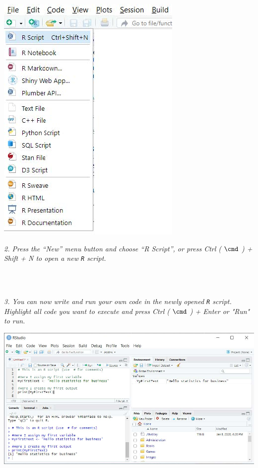 \begin{minipage}{0.5\textwidth}
\includegraphics[width=.4\linewidth]{Files/Images/setup2.jpg}
\end{minipage}%
\hfill%
\begin{minipage}{0.4\textwidth}
\textit{2. Press the “New” menu button and choose
“R Script”, or press Ctrl ( $\cmd$ ) + Shift + N to
open a new \texttt{R} script.}
\end{minipage} \\
\\
\bigskip

\begin{minipage}{0.4\textwidth}
\textit{3. You can now write and run your
own code in the newly opened
\texttt{R} script. Highlight all code you
want to execute and press
Ctrl ( $\cmd$ ) + Enter or "Run" to run.}
\end{minipage}%
\hfill%
\begin{minipage}{0.55\textwidth}
\includegraphics[width=\linewidth]{Files/Images/setup3.jpg}
\end{minipage} \\
\\
\bigskip
